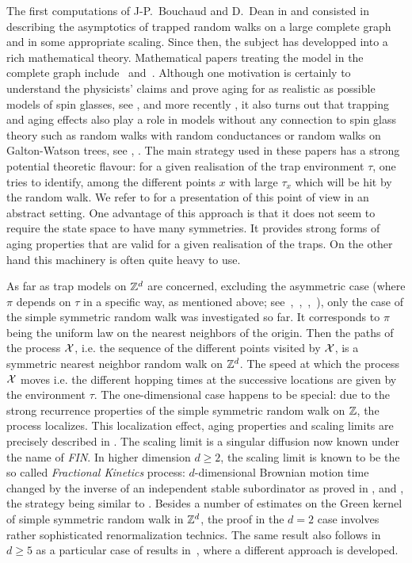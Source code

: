 The first computations of J-P.~Bouchaud and D.~Dean in \cite{kn:Bou} and \cite{kn:BD} consisted in describing the asymptotics 
of trapped random walks on a large complete graph and in some appropriate scaling. 
Since then, 
the subject has developped into a rich mathematical theory.  
 Mathematical papers treating the model in the complete graph include~\cite{kn:BF} and~\cite{kn:FM}.
Although one motivation is 
certainly to understand the physicists' claims and prove aging for as realistic as possible 
models of spin glasses, see \cite{kn:ABG1},  \cite{kn:ABG2} and more recently \cite{kn:BBC}, 
it also turns out that trapping and aging effects 
also play a role in models without any connection to spin glass theory such as 
random walks with random conductances or random walks on Galton-Watson trees, see \cite{kn:BC},  \cite{kn:AFGH}.
The main strategy used in these papers has a strong potential theoretic flavour: for a given 
realisation of the trap environment $\tau$, one tries to identify, among the different points 
 $x$ with large $\tau_x$ which will be hit by the random walk. 
We refer to \cite{kn:AC2} for a presentation of this point of 
view in an abstract setting. One advantage of this approach is that it does not seem to require the state space 
to have many symmetries. It provides strong forms of aging properties that are valid for a given 
realisation of the traps. On the other hand this machinery is often quite heavy to use. 

As far as trap models on ${\mathbb Z}^d$ are concerned, excluding the asymmetric case (where $\pi$ depends on $\tau$
in a specific way, as mentioned above; see~\cite{kn:BC},~\cite{kn:C2},~\cite{kn:AC},~\cite{kn:M}), 
only the case of the simple symmetric random walk was investigated so far.
It corresponds to $\pi$ being the uniform law on the nearest neighbors of the origin. 
Then the paths of the process ${\cal X}$, i.e. the sequence of the different points visited by ${\cal X}$, is a symmetric 
nearest neighbor  random walk on ${\mathbb Z}^d$. 
The speed at which the process ${\cal X}$ moves i.e. the different hopping times at the successive locations 
are given by the environment $\tau$. 
The one-dimensional case happens to be special:
due to the strong recurrence properties of the simple symmetric random walk on ${\mathbb Z}$, the process localizes.  
This localization effect, aging properties and scaling limits are precisely 
described in \cite{kn:FIN}. The scaling limit is a singular diffusion now known under the name of {\it FIN}. 
In higher dimension $d\geq 2$, the scaling limit is known to be the so called 
{\it Fractional Kinetics} process: $d$-dimensional Brownian motion time changed by the inverse of an 
independent stable subordinator as proved in \cite{kn:C}, \cite{kn:ACM} and \cite{kn:AC1}, the strategy 
being similar to \cite{kn:AC2}. Besides a number of estimates on the Green kernel of simple symmetric random 
walk in ${\mathbb Z}^d$, the proof in the $d=2$ case involves rather sophisticated renormalization technics.
The same result also follows in $d\geq5$ as a particular case of results in~\cite{kn:M}, where a different approach is developed.

